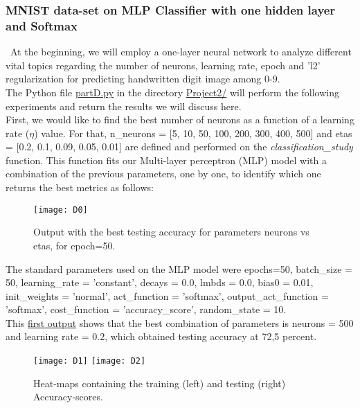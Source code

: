 \subsubsection{MNIST data-set on MLP Classifier with one hidden layer and Softmax}
\label{chap:MNIST data-set on MLP Classifier with one hidden layer and Softmax}

\quad \, At the beginning, we will employ a one-layer neural network to analyze different vital topics regarding the number of neurons, learning rate, epoch and 'l2' regularization for predicting handwritten digit image among 0-9.\\

The Python file \href{https://github.com/fabiorodp/UiO-FYS-STK4155/blob/master/Project2/partD.py}{partD.py} in the directory \href{https://github.com/fabiorodp/UiO-FYS-STK4155/blob/master/Project2/}{Project2/} will perform the following experiments and return the results we will discuss here.\\

First, we would like to find the best number of neurons as a function of a learning rate ($\eta$) value. For that, n\_neurons = [5, 10, 50, 100, 200, 300, 400, 500] and etas = [0.2, 0.1, 0.09, 0.05, 0.01] are defined and performed on the \textit{classification\_study} function. This function fits our Multi-layer perceptron (MLP) model with a combination of the previous parameters, one by one, to identify which one returns the best metrics as follows:

\begin{figure}[H]
\label{fig:D0}
\centering
\texttt{[image: D0]}
\caption{Output with the best testing accuracy for parameters neurons vs etas, for epoch=50.}
\end{figure}

The standard parameters used on the MLP model were epochs=50, batch\_size = 50, learning\_rate = 'constant', decays = 0.0, lmbds = 0.0, bias0 = 0.01, init\_weights = 'normal', act\_function = 'softmax', output\_act\_function = 'softmax', cost\_function = 'accuracy\_score', random\_state = 10.\\

This \hyperref[fig:D0]{first output} shows that the best combination of parameters is neurons = 500 and learning rate = 0.2, which obtained testing accuracy at 72,5 percent.

\begin{figure}[H]
\label{fig:D1}
\centering
\texttt{[image: D1]}
\texttt{[image: D2]}
\caption{Heat-maps containing the training (left) and testing (right) Accuracy-scores.}
\end{figure}

